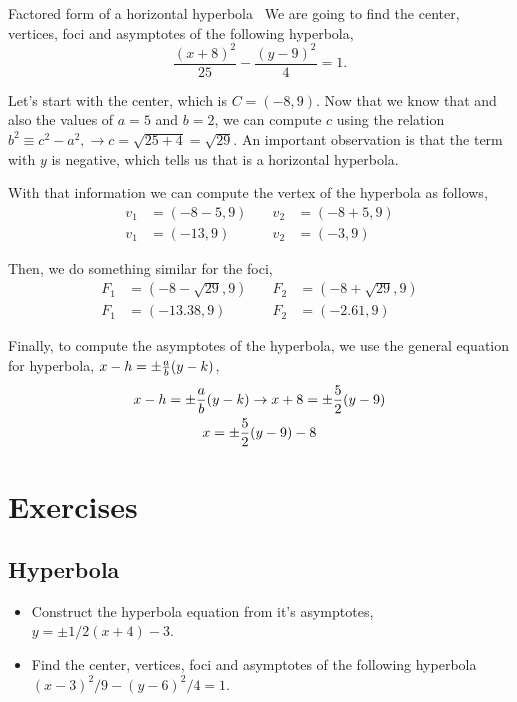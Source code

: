 \documentclass[../main-exe.tex]{subfiles}
\begin{document}
\begin{example}{Factored form of a horizontal hyperbola}{~}
    We are going to find the center, vertices, foci and asymptotes of the following hyperbola, \[\frac{(x+8)^2}{25}-\frac{(y-9)^2}{4}=1.\]

    Let's start with the center, which is $C=(-8,9)$.
    Now that we know that and also the values of $a=5$ and $b=2$, we can compute $c$ using the relation $b^2\equiv c^2 -a^2,\rightarrow c = \sqrt{25 + 4} = \sqrt{29}$.
    An important observation is that the term with $y$ is negative, which tells us that is a horizontal hyperbola.

    With that information we can compute the vertex of the hyperbola as follows,
    \begin{align*}
        v_1 &= (-8-5,9) &\quad v_2 &= (-8+5,9) \\
        v_1 &= (-13,9) &\quad v_2 &= (-3,9)
    \end{align*}

    Then, we do something similar for the foci,
    \begin{align*}
        F_1 &= (-8-\sqrt{29},9) &\quad F_2 &= (-8+\sqrt{29},9) \\
        F_1 &= (-13.38,9) &\quad F_2 &= (-2.61,9)
    \end{align*}

    Finally, to compute the asymptotes of the hyperbola, we use the general equation for hyperbola, $x-h=\pm\frac{a}{b}\qty(y-k)$,
    \begin{gather*}
        x-h=\pm\frac{a}{b}\qty(y-k)\rightarrow x+8=\pm\frac{5}{2}\qty(y-9) \\
        x = \pm\frac{5}{2}\qty(y-9) - 8
    \end{gather*}
\end{example}

\section{Exercises}

\subsection{Hyperbola}

\begin{itemize}
    \item Construct the hyperbola equation from it's asymptotes, $y = \pm 1/2(x+4)-3$.
    \item Find the center, vertices, foci and asymptotes of the following hyperbola $(x-3)^2/9-(y-6)^2/4=1$.
\end{itemize}
\end{document}
